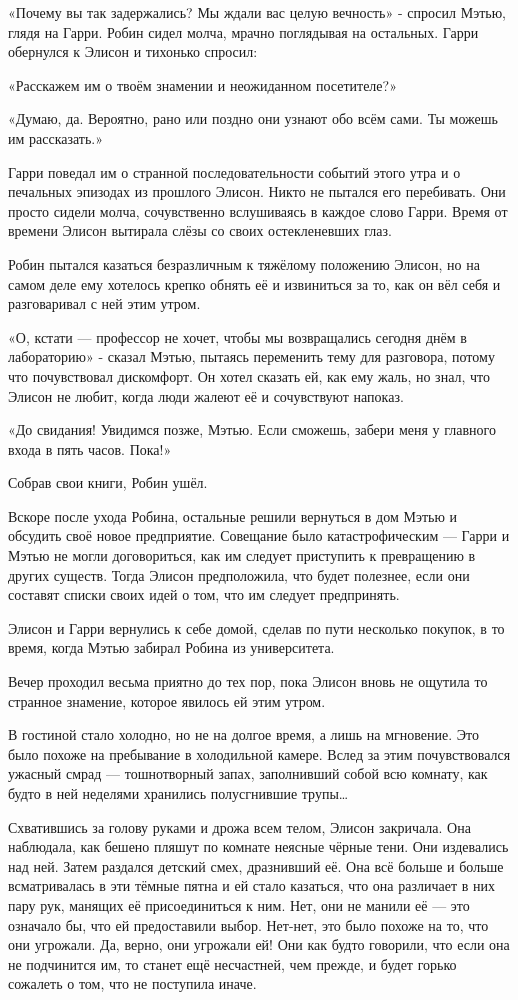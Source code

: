 \documentclass[a5paper, 9pt,
final, openany, twoside=true]{memoir}
\begin{document}
«Почему вы так задержались? Мы ждали вас целую вечность» - спросил Мэтью, глядя на Гарри. Робин сидел молча, мрачно поглядывая на остальных. Гарри обернулся к Элисон и тихонько спросил:

«Расскажем им о твоём знамении и неожиданном посетителе?»

«Думаю, да. Вероятно, рано или поздно они узнают обо всём сами. Ты можешь им рассказать.»

Гарри поведал им о странной последовательности событий этого утра и о печальных эпизодах из прошлого Элисон. Никто не пытался его перебивать. Они просто сидели молча, сочувственно вслушиваясь в каждое слово Гарри. Время от времени Элисон вытирала слёзы со своих остекленевших глаз.

Робин пытался казаться безразличным к тяжёлому положению Элисон, но на самом деле ему хотелось крепко обнять её и извиниться за то, как он вёл себя и разговаривал с ней этим утром.

«О, кстати — профессор не хочет, чтобы мы возвращались сегодня днём в лабораторию» - сказал Мэтью, пытаясь переменить тему для разговора, потому что почувствовал дискомфорт. Он хотел сказать ей, как ему жаль, но знал, что Элисон не любит, когда люди жалеют её и сочувствуют напоказ.

«До свидания! Увидимся позже, Мэтью. Если сможешь, забери меня у главного входа в пять часов. Пока!»

Собрав свои книги, Робин ушёл.\bigskip

Вскоре после ухода Робина, остальные решили вернуться в дом Мэтью и обсудить своё новое предприятие. Совещание было катастрофическим — Гарри и Мэтью не могли договориться, как им следует приступить к превращению в других существ. Тогда Элисон предположила, что будет полезнее, если они составят списки своих идей о том, что им следует предпринять.

Элисон и Гарри вернулись к себе домой, сделав по пути несколько покупок, в то время, когда Мэтью забирал Робина из университета.

Вечер проходил весьма приятно до тех пор, пока Элисон вновь не ощутила то странное знамение, которое явилось ей этим утром.

В гостиной стало холодно, но не на долгое время, а лишь на мгновение. Это было похоже на пребывание в холодильной камере. Вслед за этим почувствовался ужасный смрад — тошнотворный запах, заполнивший собой всю комнату, как будто в ней неделями хранились полусгнившие трупы…

Схватившись за голову руками и дрожа всем телом, Элисон закричала. Она наблюдала, как бешено пляшут по комнате неясные чёрные тени. Они издевались над ней. Затем раздался детский смех, дразнивший её. Она всё больше и больше всматривалась в эти тёмные пятна и ей стало казаться, что она различает в них пару рук, манящих её присоединиться к ним. Нет, они не манили её — это означало бы, что ей предоставили выбор. Нет-нет, это было похоже на то, что они угрожали. Да, верно, они угрожали ей! Они как будто говорили, что если она не подчинится им, то станет ещё несчастней, чем прежде, и будет горько сожалеть о том, что не поступила иначе.
\end{document}
